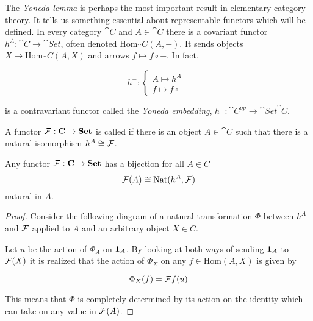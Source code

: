 \documentclass[../../main.tex]{subfiles}
\begin{document}
    The \emph{Yoneda lemma} is perhaps the most important result in elementary category theory. It tells us something essential about representable functors which will be defined. In every category $\cat{C}$ and $A \in \cat{C}$ there is a covariant functor $h^A: \cat{C} \to \cat{Set}$, often denoted $\mathrm{Hom}_\cat{C}(A, -)$. It sends objects $X \mapsto \mathrm{Hom}_\cat{C}(A, X)$ and arrows $f \mapsto f \circ -$. In fact, 
    
    \begin{equation*}
        h^-: 
        \begin{cases}
            A \mapsto h^A \\
            f \mapsto f \circ -
        \end{cases}
    \end{equation*}
    
    is a contravariant functor called the \emph{Yoneda embedding}, $h^-: \cat{C}^{op} \to \cat{Set}^\cat{C}$.
    
    \begin{definition}
        A functor $\functor{F}: \cat{C} \to \cat{Set}$ is called  if there is an object $A \in \cat{C}$ such that there is a natural isomorphism $h^A \cong \functor{F}$.
    \end{definition}
    
    \begin{theorem}
        Any functor $\functor{F}: \cat{C} \to \cat{Set}$ has a bijection for all $A \in C$ 
        $$\functor{F}(A) \cong \mathrm{Nat}(h^A, \functor{F})$$ 
        natural in $A$.
    \end{theorem}
    
    \begin{proof}
        Consider the following diagram of a natural transformation $\Phi$ between $h^A$ and $\functor{F}$ applied to $A$ and an arbitrary object $X \in C$. 
        

        Let $u$ be the action of $\Phi_A$ on $\idarrow[A]$. By looking at both ways of sending $\idarrow[A]$ to $\functor{F}(X)$ it is realized that the action of $\Phi_X$ on any $f \in \mathrm{Hom}(A, X)$ is given by 

        \begin{equation}
            \Phi_X(f) = \functor{F}f(u)
        \end{equation}
        
        This means that $\Phi$ is completely determined by its action on the identity which can take on any value in $\functor{F}(A)$.
    \end{proof}
\end{document}
